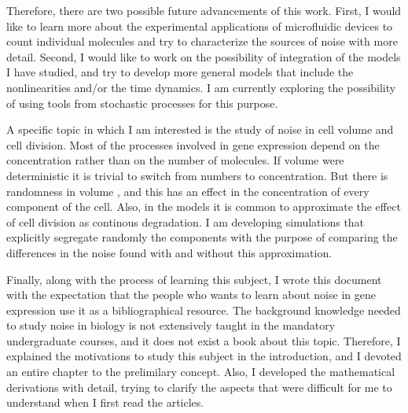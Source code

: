 Therefore, there are two possible future advancements of this work. First, I would like to learn more about the experimental applications of microfluidic devices to count individual molecules and try to characterize the sources of noise with more detail. Second, I would like to work on the possibility of integration of the models I have studied, and try to develop more general models that include the nonlinearities and/or the time dynamics. I am currently exploring the possibility of using tools from stochastic processes for this purpose.

A specific topic in which I am interested is the study of noise in cell volume and cell division. Most of the processes involved in gene expression depend on the concentration rather than on the number of molecules. If volume were deterministic it is trivial to switch from numbers to concentration. But there is randomness in volume \cite{tanouchi15}, and this has an effect in the concentration of every component of the cell. Also, in the models it is common to approximate the effect of cell division as continous degradation. I am developing simulations that explicitly segregate randomly the components with the purpose of comparing the differences in the noise found with and without this approximation.

Finally, along with the process of learning this subject, I wrote this document with the expectation that the people who wants to learn about noise in gene expression use it as a bibliographical resource. The background knowledge needed to study noise in biology is not extensively taught in the mandatory undergraduate courses, and it does not exist a book about this topic. Therefore, I explained the motivations to study this subject in the introduction, and I devoted an entire chapter to the prelimilary concept. Also, I developed the mathematical derivations with detail, trying to clarify the aspects that were difficult for me to understand when I first read the articles.
